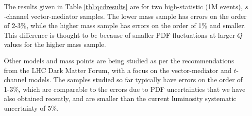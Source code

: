 The results given in Table \ref{tbl:qcdresults} are for two high-statistic (1M events), $s$-channel vector-mediator samples. The lower mass sample has errors on the order of 2-3\%, while the higher mass sample has errors on the order of 1\% and smaller. This difference is thought to be because of smaller PDF fluctuations at larger $Q$ values for the higher mass sample. 

Other models and mass points are being studied as per the recommendations from the LHC Dark Matter Forum, with a focus on the vector-mediator and $t$-channel models. The samples studied so far typically have errors on the order of 1-3\%, which are comparable to the errors due to PDF uncertainties that we have also obtained recently, and are smaller than the current luminosity systematic uncertainty of 5$\%$.
